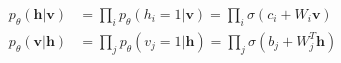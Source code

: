 $$
\begin{align}
p_\theta(\mathbf{h}|\mathbf{v})&=\prod_i p_\theta(h_i=1|\mathbf{v})=\prod_i \sigma(c_i + W_i \mathbf{v})\\
p_\theta(\mathbf{v}|\mathbf{h})&=\prod_j p_\theta(v_j=1|\mathbf{h})=\prod_j \sigma(b_j + W_j^T \mathbf{h})
\end{align}
$$